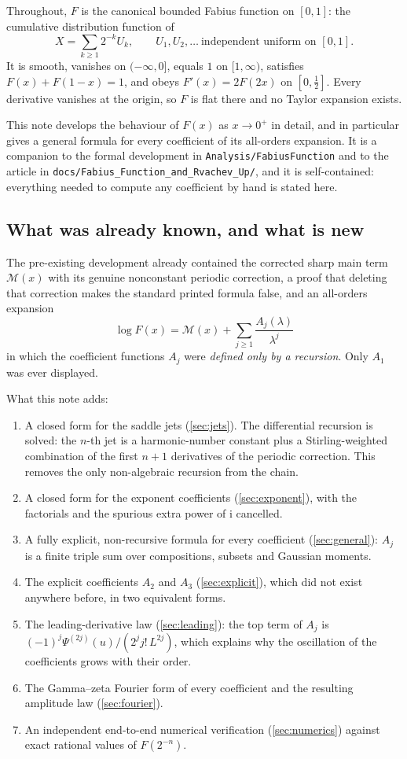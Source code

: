 \documentclass[11pt,oneside]{article}
\theoremstyle{definition}
\theoremstyle{remark}
\newcommand{\ii}{\mathrm i}
\newcommand{\repo}{\nolinkurl{Analysis/FabiusFunction}}
\begin{document}
Throughout, $F$ is the canonical bounded Fabius function on $[0,1]$: the
cumulative distribution function of
\[
  X=\sum_{k\ge1}2^{-k}U_k,\qquad U_1,U_2,\dots\ \text{independent uniform on }[0,1].
\]
It is smooth, vanishes on $(-\infty,0]$, equals $1$ on $[1,\infty)$, satisfies
$F(x)+F(1-x)=1$, and obeys $F'(x)=2F(2x)$ on $[0,\tfrac12]$.  Every derivative
vanishes at the origin, so $F$ is flat there and no Taylor expansion exists.

This note develops the behaviour of $F(x)$ as $x\to0^+$ in detail, and in
particular gives a general formula for every coefficient of its all-orders
expansion.  It is a companion to the formal development in \repo{} and to the
article in \nolinkurl{docs/Fabius_Function_and_Rvachev_Up/}, and it is
self-contained: everything needed to compute any coefficient by hand is stated
here.

\subsection{What was already known, and what is new}

The pre-existing development already contained the corrected sharp main term
$\mathcal M(x)$ with its genuine nonconstant periodic correction, a proof that
deleting that correction makes the standard printed formula false, and an
all-orders expansion
\[
  \log F(x)=\mathcal M(x)+\sum_{j\ge1}\frac{A_j(\lambda)}{\lambda^j}
\]
in which the coefficient functions $A_j$ were \emph{defined only by a
recursion}.  Only $A_1$ was ever displayed.

What this note adds:

\begin{enumerate}
\item A closed form for the saddle jets (\cref{sec:jets}).  The differential
  recursion is solved: the $n$-th jet is a harmonic-number constant plus a
  Stirling-weighted combination of the first $n+1$ derivatives of the periodic
  correction.  This removes the only non-algebraic recursion from the chain.
\item A closed form for the exponent coefficients (\cref{sec:exponent}), with
  the factorials and the spurious extra power of $\ii$ cancelled.
\item A fully explicit, non-recursive formula for every coefficient
  (\cref{sec:general}): $A_j$ is a finite triple sum over compositions, subsets
  and Gaussian moments.
\item The explicit coefficients $A_2$ and $A_3$ (\cref{sec:explicit}), which did
  not exist anywhere before, in two equivalent forms.
\item The leading-derivative law (\cref{sec:leading}): the top term of $A_j$ is
  $(-1)^j\Psi^{(2j)}(u)/(2^jj!\,L^{2j})$, which explains why the oscillation of
  the coefficients grows with their order.
\item The Gamma--zeta Fourier form of every coefficient and the resulting
  amplitude law (\cref{sec:fourier}).
\item An independent end-to-end numerical verification (\cref{sec:numerics})
  against exact rational values of $F(2^{-n})$.
\end{enumerate}
\end{document}
